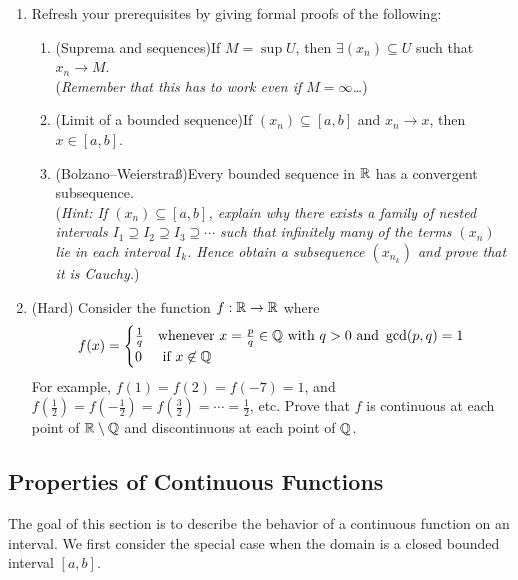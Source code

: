 \begin{exercises}
\begin{enumerate}
  \item\label{exs:extremevaluelemma} Refresh your prerequisites by giving formal proofs of the following:
  \begin{enumerate}
    \item (Suprema and sequences)\quad If $M=\sup U$, then $\exists (x_n)\subseteq U$ such that $x_n\to M$.\\
    (\emph{Remember that this has to work even if $M=\infty$\ldots})
    \item (Limit of a bounded sequence)\quad If $(x_n)\subseteq[a,b]$ and $x_n\to x$, then $x\in [a,b]$.
		\item (Bolzano--Weierstraß)\quad Every bounded sequence in $\mathbb{R}$ has a convergent subsequence.\\
		(\emph{Hint: If $(x_n)\subseteq [a,b]$, explain why there exists a family of nested intervals $I_1\supseteq I_2\supseteq I_3\supseteq\cdots$ such that \emph{infinitely many} of the terms $(x_n)$ lie in each interval $I_k$. Hence obtain a subsequence $(x_{n_k})$ and prove that it is \emph{Cauchy.}\footnotemark})
	\end{enumerate}
	
	\item (Hard) 	Consider the function $f:\mathbb{R}\to\mathbb{R}$ where
	\[f(x)=\begin{cases}
	\frac 1q&\text{whenever }x=\frac pq\in\mathbb{Q}\text{ with }q>0\text{ and }\gcd(p,q)=1\\
	0&\text{ if }x\not\in\mathbb{Q}
	\end{cases}\]
  	For example, $f(1)=f(2)=f(-7)=1$, and $f(\tfrac 12)=f(-\tfrac 12)=f(\tfrac 32)=\cdots=\frac 12$, etc. Prove that $f$ is continuous at each point of $\mathbb{R}\setminus\mathbb{Q}$ and discontinuous at each point of $\mathbb{Q}$.
\end{enumerate}
\end{exercises}


\vfil
\goodbreak


\subsection{Properties of Continuous Functions}\label{sec:propcont}


The goal of this section is to describe the behavior of a continuous function on an interval. We first consider the special case when the domain is a closed bounded interval $[a,b]$.

